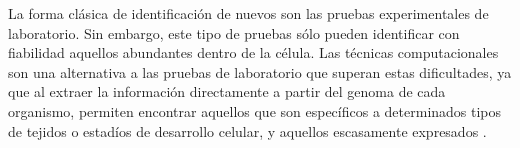 La forma clásica de identificación de nuevos  son las
pruebas experimentales de laboratorio.
Sin embargo, este tipo de pruebas sólo pueden identificar con
fiabilidad aquellos  abundantes dentro de la célula.
Las técnicas computacionales son una alternativa a las pruebas de
laboratorio que superan estas dificultades, ya que al extraer la
información directamente a partir del genoma de cada organismo,
permiten encontrar aquellos  que son específicos a
determinados tipos de tejidos o estadíos de desarrollo celular, y
aquellos escasamente expresados \cite{ding,sheng,xu}.
